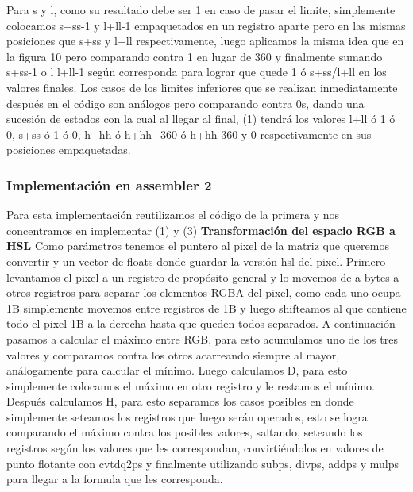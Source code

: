 \documentclass[a4paper]{article}
\begin{document}
Para s y l, como su resultado debe ser 1 en caso de pasar el limite, simplemente colocamos s+ss-1 y l+ll-1 empaquetados en un registro aparte pero en las mismas posiciones que s+ss y l+ll respectivamente, luego aplicamos la misma idea que en la figura 10 pero comparando contra 1 en lugar de 360 y finalmente sumando s+ss-1 o l l+ll-1 según corresponda para lograr que quede 1 ó s+ss/l+ll en los valores finales. Los casos de los limites inferiores que se realizan inmediatamente después en el código son análogos pero comparando contra 0s, dando una sucesión de estados con la cual al llegar al final, (1) tendrá los valores l+ll ó 1 ó 0, s+ss ó 1 ó 0,  h+hh ó h+hh+360 ó h+hh-360 y 0 respectivamente en sus posiciones empaquetadas.

\subsubsection{Implementación en assembler 2}
Para esta implementación reutilizamos el código de la primera y nos concentramos en implementar (1) y (3)
\newline\newline
\textbf{Transformación del espacio RGB a HSL}
\newline\newline
Como parámetros tenemos el puntero al pixel de la matriz que queremos convertir y un vector de floats donde guardar la versión hsl del pixel.
Primero levantamos el pixel a un registro de propósito general y lo movemos de a bytes a otros registros para separar los elementos RGBA del pixel, como cada uno ocupa 1B  simplemente movemos entre registros de 1B y luego shifteamos al que contiene todo el pixel 1B a la derecha hasta que queden todos separados.
\newline
A continuación pasamos a calcular el máximo entre RGB, para esto acumulamos uno de los tres valores y comparamos contra los otros acarreando siempre al mayor, análogamente para calcular el mínimo.
\newline
Luego calculamos D, para esto simplemente colocamos el máximo en otro registro y le restamos el mínimo.
\newline
Después calculamos H, para esto separamos los casos posibles en donde simplemente seteamos los registros que luego serán operados, esto se logra comparando el máximo contra los posibles valores, saltando, seteando los registros según los valores que les correspondan, convirtiéndolos en valores de punto flotante con cvtdq2ps y finalmente utilizando subps, divps, addps y mulps para llegar a la formula que les corresponda.
\newline
\end{document}
